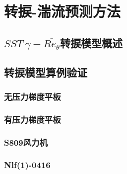 \chapter{转捩-湍流预测方法}\label{introduction}
\section{$SST~\gamma-\overline{Re_\theta}$转捩模型概述}


 

\section{转捩模型算例验证}
\subsection{无压力梯度平板}

\subsection{有压力梯度平板}

\subsection{S809风力机}

\subsection{Nlf(1)-0416}


